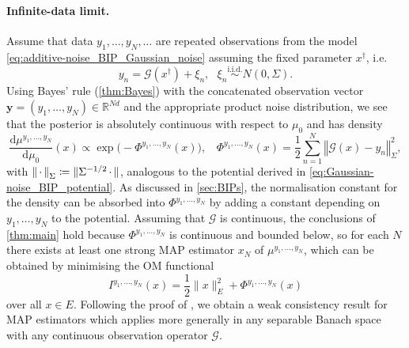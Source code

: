 \documentclass[11pt]{article}
\newcommand*{\defeq}{\coloneqq}
\newcommand*{\quark}{\setbox0\hbox{$x$}\hbox to\wd0{\hss$\cdot$\hss}}
\newcommand*{\rd}{\mathrm{d}}
\newcommand*{\Reals}{\mathbb{R}}
\theoremstyle{plain}
\theoremstyle{definition}
\newcommand{\norm}[1]{\lVert #1 \rVert}
\newcommand{\Norm}[1]{\left\Vert #1 \right\Vert}
\numberwithin{equation}{section}
\numberwithin{figure}{section}
\numberwithin{table}{section}
\begin{document}
\paragraph{Infinite-data limit.}
Assume that data $y_{1}, \dots, y_{N}, \dots$ are repeated observations from the model \eqref{eq:additive-noise_BIP_Gaussian_noise} assuming the fixed parameter $x^{\dagger}$, i.e.\ 
\begin{equation} \label{eq:observation_model_infinite-data_limit}
	y_{n} = \mathcal{G}(x^{\dagger}) + \xi_{n},~~~\xi_{n} \overset{\text{i.i.d.}}{\sim} N(0, \Sigma).
\end{equation}
Using Bayes' rule (\cref{thm:Bayes}) with the concatenated observation vector $\bm{y} = (y_{1}, \dots, y_{N}) \in \Reals^{Nd}$ and the appropriate product noise distribution, we see that the posterior  is absolutely continuous with respect to $\mu_{0}$ and has density
\begin{equation} \label{eq:posterior_Gaussian_noise}
	\frac{\rd \mu^{y_{1}, \dots, y_{N}}}{\rd \mu_{0}}(x) \propto \exp\bigl(-\Phi^{y_{1}, \dots, y_{N}}(x)\bigr),~~~~\Phi^{y_{1}, \dots, y_{N}}(x) = \frac{1}{2} \sum_{n = 1}^{N} \Norm{\mathcal{G}(x) - y_{n}}_{\Sigma}^{2},
\end{equation}
with $\Norm{\quark}_{\Sigma} \defeq \norm{\Sigma^{-1/2} \quark}$, analogous to the potential derived in \eqref{eq:Gaussian-noise_BIP_potential}.
As discussed in \cref{sec:BIPs}, the normalisation constant for the density can be absorbed into $\Phi^{y_{1}, \dots, y_{N}}$ by adding a constant depending on $y_{1}, \dots, y_{N}$ to the potential.
Assuming that $\mathcal{G}$ is continuous, the conclusions of \cref{thm:main} hold because $\Phi^{y_{1}, \dots, y_{N}}$ is continuous and bounded below, so for each $N$ there exists at least one strong MAP estimator $x_{N}$ of $\mu^{y_{1}, \dots, y_{N}}$, which can be obtained by minimising the OM functional
\begin{equation*}
	I^{y_{1}, \dots, y_{N}}(x) = \frac{1}{2} \norm{x}_{E}^{2} + \Phi^{y_{1}, \dots, y_{N}}(x)
\end{equation*}
over all $x \in E$.
Following the proof of \citet[Theorem~4.1 and Corollary~4.3]{DashtiLawStuartVoss2013}, we obtain a weak consistency result for MAP estimators which applies more generally in any separable Banach space with any continuous observation operator $\mathcal{G}$.
\end{document}
